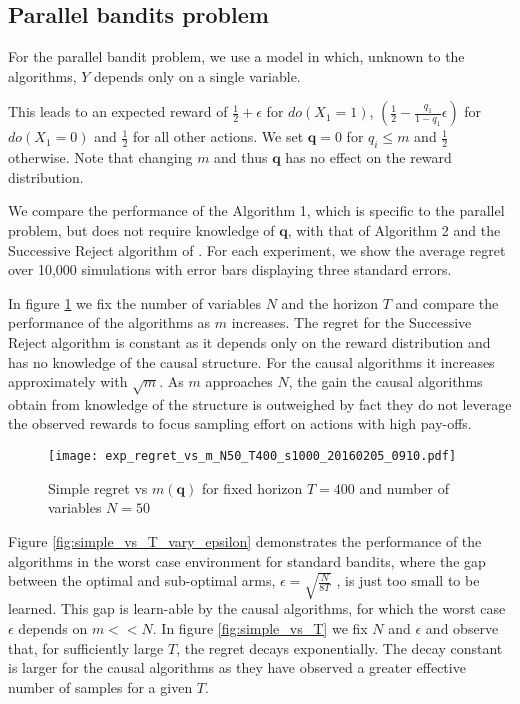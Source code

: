 \subsection{Parallel bandits problem}

For the parallel bandit problem, we use a model in which, unknown to the algorithms, $Y$ depends only on a single variable.

This leads to an expected reward of $\frac{1}{2}+\epsilon$ for $do(X_1=1)$, $\left(\frac{1}{2}-\frac{q_1}{1-q_1}\epsilon\right)$ for $do(X_1=0)$ and $\frac{1}{2}$ for all other actions. We set $\boldsymbol{q} = 0$ for $q_i \leq m$ and $\frac{1}{2}$ otherwise. Note that changing $m$ and thus $\boldsymbol{q}$ has no effect on the reward distribution. 

We compare the performance of the Algorithm 1, which is specific to the parallel problem, but does not require knowledge of $\boldsymbol{q}$, with that of Algorithm 2 and the Successive Reject algorithm of \cite{audibert2010best}. For each experiment, we show the average regret over 10,000 simulations with error bars displaying three standard errors.

In figure \ref{fig:simple_vs_m} we fix the number of variables $N$ and the horizon $T$ and compare the performance of the algorithms as $m$ increases. The regret for the Successive Reject algorithm is constant as it depends only on the reward distribution and has no knowledge of the causal structure. For the causal algorithms it increases approximately with $\sqrt{m}$. As $m$ approaches $N$, the gain the causal algorithms obtain from knowledge of the structure is outweighed by fact they do not leverage the observed rewards to focus sampling effort on actions with high pay-offs.

\begin{figure}[h]
\centering
\texttt{[image: exp\_regret\_vs\_m\_N50\_T400\_s1000\_20160205\_0910.pdf]}
\caption{Simple regret vs $m(\boldsymbol{q})$ for fixed horizon $T=400$ and number of variables $N = 50$}
\label{fig:simple_vs_m}
\end{figure}

Figure \ref{fig:simple_vs_T_vary_epsilon} demonstrates the performance of the algorithms in the worst case environment for standard bandits, where the gap between the optimal and sub-optimal arms, $\epsilon = \sqrt{\frac{N}{8T}}$ , is just too small to be learned. This gap is learn-able by the causal algorithms, for which the worst case $\epsilon$ depends on $m << N$. In figure \ref{fig:simple_vs_T} we fix $N$ and $\epsilon$ and observe that, for sufficiently large $T$, the regret decays exponentially. The decay constant is larger for the causal algorithms as they have observed a greater effective number of samples for a given $T$. 


